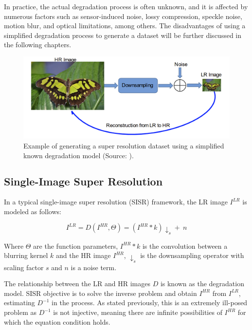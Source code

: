     In practice, the actual degradation process is often unknown, and it is affected by numerous factors such as sensor-induced noise, lossy compression, speckle noise, motion blur, and optical limitations, among others.
    The disadvantages of using a simplified degradation process to generate a dataset will be further discussed in the following chapters.

    \begin{figure}[H]
        \centering
        \includegraphics[width=\textwidth]{Includes/3-super-resolution-data.png}
        \caption{Example of generating a super resolution dataset using a simplified known degradation model (Source: \cite{bashir2021comprehensive}).}
        \label{fig:3-super-resolution-data}
    \end{figure}

    

    \subsection{Single-Image Super Resolution}

        In a typical single-image super resolution (SISR) framework, the LR image $I^{LR}$ is modeled as follows:
    
        \begin{equation}
            I^{LR} = D(I^{HR},\Theta) = ( I^{HR} \ast k) \downarrow_s + \ n
            \label{eq:2-degradation-equation}
        \end{equation}
    
        Where $\Theta$ are the function parameters, $I^{HR} \ast k$ is the convolution between a blurring kernel $k$ and the  HR image  $I^{HR}$, $\downarrow_s$ is the downsampling operator with scaling factor $s$ and $n$ is a noise term.
        
        The relationship between the LR and HR images $D$ is known as the degradation model.
        SISR objective is to solve the inverse problem and obtain $I^{HR}$ from $I^{LR}$, estimating $D^{-1}$ in the process. As stated previously, this is an extremely ill-posed problem as $D^{-1}$ is not injective, meaning there are infinite possibilities of $I^{HR}$ for which the equation condition holds. 

